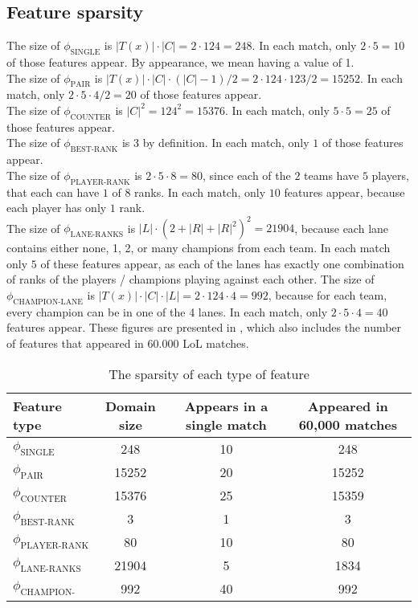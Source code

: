 \subsection{Feature sparsity}\label{sec:featuresparsity}
The size of $\phi_{\text{SINGLE}}$ is $|T(x)| \cdot |C| = 2 \cdot 124 = 248$. In each match, only $2 \cdot 5 = 10$ of those features appear. By appearance, we mean having a value of 1.\\
The size of $\phi_{\text{PAIR}}$ is $|T(x)| \cdot |C| \cdot (|C|-1) / 2 = 2 \cdot 124 \cdot 123 / 2 = 15252$. In each match, only $2 \cdot 5 \cdot 4 / 2 = 20$ of those features appear.\\
The size of $\phi_{\text{COUNTER}}$ is $|C|^2 = 124^2 = 15376$. In each match, only $5 \cdot 5 = 25$ of those features appear.\\
The size of $\phi_{\text{BEST-RANK}}$ is 3 by definition. In each match, only $1$ of those features appear.\\
The size of $\phi_{\text{PLAYER-RANK}}$ is $2 \cdot 5 \cdot 8 = 80$, since each of the $2$ teams have $5$ players, that each can have $1$ of $8$ ranks. In each match, only $10$ features appear, because each player has only $1$ rank.\\
The size of $\phi_{\text{LANE-RANKS}}$ is $|L| \cdot (2 + |R| + |R|^2)^2 = 21904$, because each lane contains either none, 1, 2, or many champions from each team.
In each match only $5$ of these features appear, as each of the lanes has exactly one combination of ranks of the players / champions playing against each other.
The size of $\phi_{\text{CHAMPION-LANE}}$ is $|T(x)| \cdot |C| \cdot |L| = 2 \cdot 124 \cdot 4 = 992$, because for each team, every champion can be in one of the 4 lanes. In each match, only $2 \cdot 5 \cdot 4 = 40$ features appear. 
These figures are presented in , which also includes the number of features that appeared in $60.000$ LoL matches.

\begin{center}
\begin{table}[h]
\begin{tabular}{|l|ccc|}
\hline
Feature type                & Domain size & Appears in a single match & Appeared in 60,000 matches \\ \hline
$\phi_{\text{SINGLE}}$      & 248         & 10 & 248               \\ 
$\phi_{\text{PAIR}}$        & 15252       & 20 & 15252             \\ 
$\phi_{\text{COUNTER}}$     & 15376       & 25 & 15359             \\ 
$\phi_{\text{BEST-RANK}}$   & 3           & 1  & 3                 \\ 
$\phi_{\text{PLAYER-RANK}}$ & 80          & 10 & 80                \\ 
$\phi_{\text{LANE-RANKS}}$  & 21904       & 5  & 1834              \\ 
$\phi_{\text{CHAMPION-LANE}}$ & 992       & 40 & 992               \\ \hline
\end{tabular}
\caption{The sparsity of each type of feature}\label{tab:featuresparsity}
\end{table}
\end{center}

